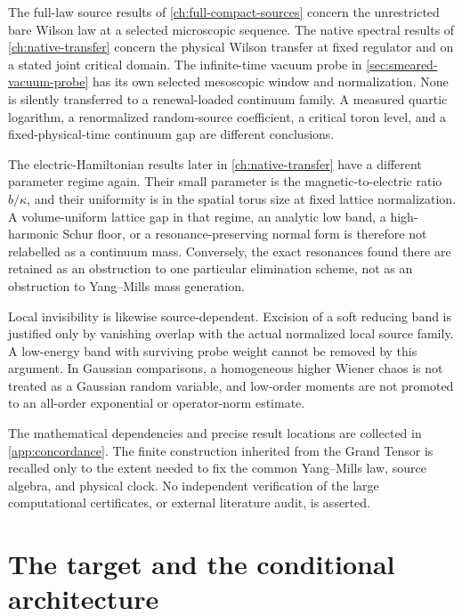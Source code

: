 \documentclass[11pt,oneside,openany]{book}
\theoremstyle{definition}
\theoremstyle{remark}
\begin{document}
The full-law source results of \cref{ch:full-compact-sources} concern
the unrestricted bare Wilson law at a selected microscopic sequence.
The native spectral results of \cref{ch:native-transfer} concern the
physical Wilson transfer at fixed regulator and on a stated joint
critical domain. The infinite-time vacuum probe in
\cref{sec:smeared-vacuum-probe} has its own selected mesoscopic
window and normalization. None is silently transferred to a
renewal-loaded continuum family. A measured quartic logarithm, a
renormalized random-source coefficient, a critical toron level, and
a fixed-physical-time continuum gap are different conclusions.

The electric-Hamiltonian results later in \cref{ch:native-transfer}
have a different parameter regime again. Their small parameter is the
magnetic-to-electric ratio $b/\kappa$, and their uniformity is in the
spatial torus size at fixed lattice normalization. A volume-uniform
lattice gap in that regime, an analytic low band, a high-harmonic
Schur floor, or a resonance-preserving normal form is therefore not
relabelled as a continuum mass. Conversely, the exact resonances found
there are retained as an obstruction to one particular elimination
scheme, not as an obstruction to Yang--Mills mass generation.

Local invisibility is likewise source-dependent. Excision of a soft
reducing band is justified only by vanishing overlap with the actual
normalized local source family. A low-energy band with surviving
probe weight cannot be removed by this argument. In Gaussian
comparisons, a homogeneous higher Wiener chaos is not treated as a
Gaussian random variable, and low-order moments are not promoted to
an all-order exponential or operator-norm estimate.

The mathematical dependencies and precise result locations are collected
in \cref{app:concordance}. The finite construction inherited from the
Grand Tensor is recalled only to the extent needed to fix the common
Yang--Mills law, source algebra, and physical clock. No independent
verification of the large computational certificates, or external
literature audit, is asserted.

\tableofcontents
\mainmatter
\chapter{The target and the conditional architecture}
\label{ch:architecture}
\end{document}
